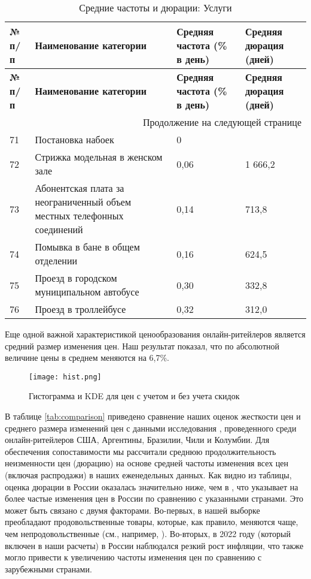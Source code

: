 \begin{longtable}{|p{1cm}|p{8.5cm}|p{3.5cm}|p{3cm}|} %
	\caption{Средние частоты и дюрации: Услуги}
	\label{tab:services} \\
	\hline
	\textbf{№ п/п} & \textbf{Наименование категории} & \textbf{Средняя частота (\% в день)} & \textbf{Средняя дюрация (дней)} \\
	\hline
	\hline
	\endfirsthead
	
	\hline
	\textbf{№ п/п} & \textbf{Наименование категории} & \textbf{Средняя частота (\% в день)} & \textbf{Средняя дюрация (дней)} \\
	\hline
	\hline
	\endhead
	
	\hline
	\multicolumn{4}{r}{Продолжение на следующей странице} \\
	\hline
	\endfoot
	
	\hline
	\endlastfoot
	
	71 & Постановка набоек & 0 &  \\ \hline
	72 & Стрижка модельная в женском зале & 0,06 & 1 666,2 \\ \hline
	73 & Абонентская плата за неограниченный объем местных телефонных соединений & 0,14 & 713,8 \\ \hline
	74 & Помывка в бане в общем отделении & 0,16 & 624,5 \\ \hline
	75 & Проезд в городском муниципальном автобусе & 0,30 & 332,8 \\ \hline
	76 & Проезд в троллейбусе & 0,32 & 312,0 \\ \hline
	
\end{longtable}


Еще одной важной характеристикой ценообразования онлайн-ритейлеров является средний размер изменения цен. Наш результат показал, что по абсолютной величине цены в среднем меняются на 6,7\%. 

\begin{figure}[h!]
	\centering
	\texttt{[image: hist.png]} %
	\caption{Гистограмма и KDE для цен с учетом и без учета скидок}
	\label{fig:hist}
\end{figure}

В таблице \ref{tab:comparison} приведено сравнение наших оценок жесткости цен и среднего размера изменений цен с данными исследования \cite{cavallo2018scraped}, проведенного среди онлайн-ритейлеров США, Аргентины, Бразилии, Чили и Колумбии. Для обеспечения сопоставимости мы рассчитали среднюю продолжительность неизменности цен (дюрацию) на основе средней частоты изменения всех цен (включая распродажи) в наших еженедельных данных. Как видно из таблицы, оценка дюрации в России оказалась значительно ниже, чем в \cite{cavallo2018scraped}, что указывает на более частые изменения цен в России по сравнению с указанными странами. Это может быть связано с двумя факторами. Во-первых, в нашей выборке преобладают продовольственные товары, которые, как правило, меняются чаще, чем непродовольственные (см., например, \cite{bils2004some}). Во-вторых, в 2022 году (который включен в наши расчеты) в России наблюдался резкий рост инфляции, что также могло привести к увеличению частоты изменения цен по сравнению с зарубежными странами.

